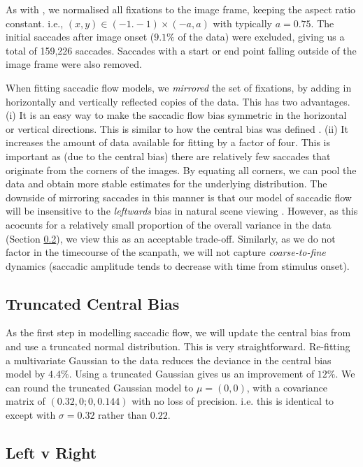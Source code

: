 \documentclass[a4paper, twocolumn, oneside, 11pt]{article}
\begin{document}
As with \cite{clarke-tatler2014}, we normalised all fixations to the image frame, keeping the aspect ratio constant. i.e., $(x,y)\in (-1.-1)\times(-a,a)$ with typically $a=0.75$. The initial saccades after image onset ($9.1\%$ of the data) were excluded, giving us a total of 159,226 saccades. Saccades with a start or end point falling outside of the image frame were also removed. 

When fitting saccadic flow models, we \textit{mirrored} the set of fixations, by adding in horizontally and vertically reflected copies of the data. This has two advantages. (i) It is an easy way to make the saccadic flow bias symmetric in the horizontal or vertical directions. This is similar to how the central bias was defined \cite{clarke-tatler2014}. (ii) It increases the amount of data available for fitting by a factor of four. This is important as (due to the central bias) there are relatively few saccades that originate from the corners of the images. By equating all corners, we can pool the data and obtain more stable estimates for the underlying distribution. The downside of mirroring saccades in this manner is that our model of saccadic flow will be insensitive to the \textit{leftwards} bias in natural scene viewing \citep{nuthmann-matthias2014}. However, as this acocunts for a relatively small proportion of the overall variance in the data (Section \ref{sec:LeftRight}), we view this as an acceptable trade-off. Similarly, as we do not factor in the timecourse of the scanpath, we will not capture \textit{coarse-to-fine} dynamics (saccadic amplitude tends to decrease with time from stimulus onset).


\subsection{Truncated Central Bias}
\label{sec:truncatedCentral}

As the first step in modelling saccadic flow, we will update the central bias from \cite{clarke-tatler2014} and use a truncated normal distribution. This is very straightforward. Re-fitting a multivariate Gaussian to the data reduces the deviance in the central bias model by $4.4\%$. Using a truncated Gaussian gives us an improvement of $12\%$. We can round the truncated Gaussian model to $\mu = (0,0)$, with a covariance matrix of $(0.32, 0; 0, 0.144)$ with no loss of precision. i.e. this is identical to \cite{clarke-tatler2014} except with $\sigma=0.32$ rather than $0.22$.
\subsection{Left v Right}
\label{sec:LeftRight}
\end{document}
